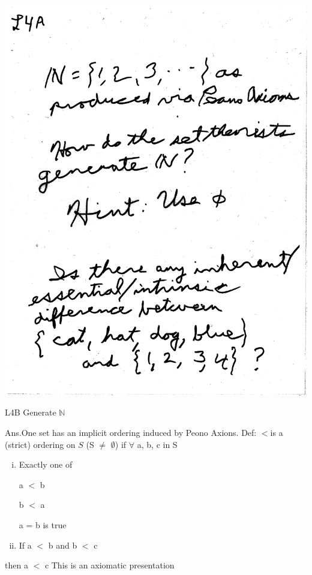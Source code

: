 \documentclass[10pt,a4paper]{article}
\begin{document}
\includegraphics[scale=0.5]{Pages/generateN1.pdf}

\newpage

\begin{Large}
L4B Generate $\mathbb{N}$
\end{Large}

Ans.One set has an implicit ordering induced by Peono Axions.
Def: $<$is a (strict) ordering on $S$ (S $\neq$ $\emptyset$) if $\forall$ a, b, c in S 

\begin{enumerate}[(i)]
\item Exactly one of 

a $<$ b

b $<$ a

a = b is true 
\item If a $<$ b and b $<$ c 
\end{enumerate}
then a $<$ c
This is an axiomatic presentation
\end{document}
